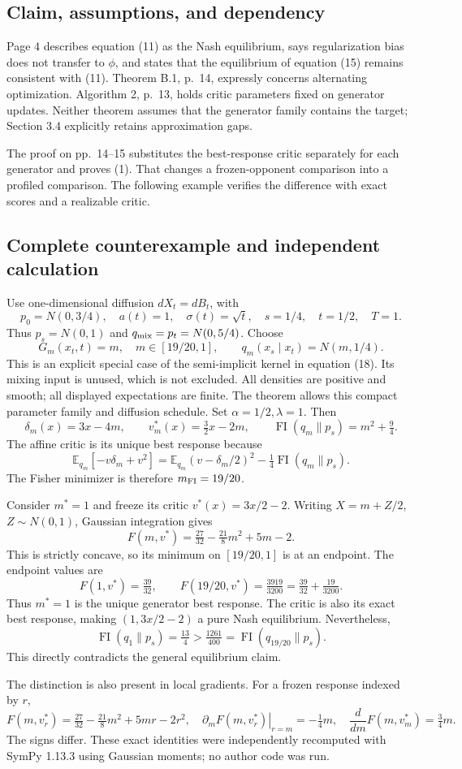 \documentclass[10pt]{article}
\begin{document}
\subsection*{Claim, assumptions, and dependency}
Page 4 describes equation (11) as the Nash equilibrium, says regularization bias does not transfer to \(\phi\), and states that the equilibrium of equation (15) remains consistent with (11). Theorem B.1, p. 14, expressly concerns alternating optimization. Algorithm 2, p. 13, holds critic parameters fixed on generator updates. Neither theorem assumes that the generator family contains the target; Section 3.4 explicitly retains approximation gaps.\par
The proof on pp. 14–15 substitutes the best-response critic separately for each generator and proves (1). That changes a frozen-opponent comparison into a profiled comparison. The following example verifies the difference with exact scores and a realizable critic.\par
\subsection*{Complete counterexample and independent calculation}
Use one-dimensional diffusion \(dX_t=dB_t\), with \[p_0=N(0,3/4),\quad a(t)=1,\quad \sigma(t)=\sqrt t,\quad
 s=1/4,\quad t=1/2,\quad T=1.\] Thus \(p_s=N(0,1)\) and \(q_{\rm mix}=p_t=N(0,5/4)\). Choose \[G_m(x_t,t)=m,\quad m\in[19/20,1],\qquad
 q_m(x_s\mid x_t)=N(m,1/4).\] This is an explicit special case of the semi-implicit kernel in equation (18). Its mixing input is unused, which is not excluded. All densities are positive and smooth; all displayed expectations are finite. The theorem allows this compact parameter family and diffusion schedule. Set \(\alpha=1/2,\lambda=1\). Then \[\delta_m(x)=3x-4m,\qquad
 v_m^*(x)=\tfrac32x-2m,\qquad
 \operatorname{FI}(q_m\|p_s)=m^2+\tfrac94.\] The affine critic is its unique best response because \[\mathbb E_{q_m}[-v\delta_m+v^2]
 =\mathbb E_{q_m}(v-\delta_m/2)^2-\tfrac14\operatorname{FI}(q_m\|p_s).\] The Fisher minimizer is therefore \(m_{\rm FI}=19/20\).\par
Consider \(m^*=1\) and freeze its critic \(v^*(x)=3x/2-2\). Writing \(X=m+Z/2\), \(Z\sim N(0,1)\), Gaussian integration gives \[F(m,v^*)=\tfrac{27}{32}-\tfrac{21}{8}m^2+5m-2.\] This is strictly concave, so its minimum on \([19/20,1]\) is at an endpoint. The endpoint values are \[F(1,v^*)=\tfrac{39}{32},\qquad
 F(19/20,v^*)=\tfrac{3919}{3200}
             =\tfrac{39}{32}+\tfrac{19}{3200}.\] Thus \(m^*=1\) is the unique generator best response. The critic is also its exact best response, making \((1,3x/2-2)\) a pure Nash equilibrium. Nevertheless, \[\operatorname{FI}(q_1\|p_s)=\tfrac{13}{4}
 >\tfrac{1261}{400}
 =\operatorname{FI}(q_{19/20}\|p_s).\] This directly contradicts the general equilibrium claim.\par
The distinction is also present in local gradients. For a frozen response indexed by \(r\), \[F(m,v_r^*)=\tfrac{27}{32}-\tfrac{21}{8}m^2+5mr-2r^2,
\quad
 \left.\partial_m F(m,v_r^*)\right|_{r=m}=-\tfrac14m,
\quad
 \frac{d}{dm}F(m,v_m^*)=\tfrac34m.\] The signs differ. These exact identities were independently recomputed with SymPy 1.13.3 using Gaussian moments; no author code was run.\par
\end{document}

